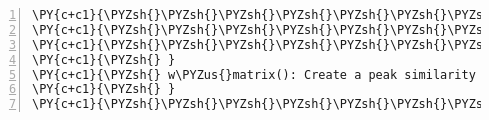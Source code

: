 \begin{Verbatim}[commandchars=\\\{\},codes={\catcode`\$=3\catcode`\^=7\catcode`\_=8},gobble=0,numbers=left,fontfamily=fvm,fontshape=n,fontsize=\footnotesize,tabsize=2]
\PY{c+c1}{\PYZsh{}\PYZsh{}\PYZsh{}\PYZsh{}\PYZsh{}\PYZsh{}\PYZsh{}\PYZsh{}\PYZsh{}\PYZsh{}\PYZsh{}\PYZsh{}\PYZsh{}\PYZsh{}\PYZsh{}\PYZsh{}\PYZsh{}\PYZsh{}\PYZsh{}\PYZsh{}\PYZsh{}\PYZsh{}\PYZsh{}\PYZsh{}\PYZsh{}\PYZsh{}\PYZsh{}\PYZsh{}\PYZsh{}\PYZsh{}\PYZsh{}\PYZsh{}\PYZsh{}\PYZsh{}\PYZsh{}\PYZsh{}\PYZsh{}\PYZsh{}\PYZsh{}\PYZsh{}\PYZsh{}\PYZsh{}\PYZsh{}\PYZsh{}\PYZsh{}\PYZsh{}\PYZsh{}\PYZsh{}\PYZsh{}\PYZsh{}\PYZsh{}\PYZsh{}\PYZsh{}\PYZsh{}\PYZsh{}\PYZsh{}\PYZsh{}\PYZsh{}\PYZsh{}\PYZsh{}\PYZsh{}\PYZsh{}\PYZsh{}\PYZsh{}\PYZsh{}\PYZsh{}\PYZsh{}\PYZsh{}\PYZsh{}\PYZsh{}\PYZsh{}\PYZsh{}\PYZsh{}\PYZsh{}\PYZsh{}\PYZsh{}\PYZsh{}\PYZsh{}\PYZsh{}}
\PY{c+c1}{\PYZsh{}\PYZsh{}\PYZsh{}\PYZsh{}\PYZsh{}\PYZsh{}\PYZsh{}\PYZsh{}\PYZsh{}\PYZsh{}\PYZsh{}\PYZsh{}\PYZsh{}\PYZsh{}\PYZsh{}\PYZsh{}\PYZsh{}\PYZsh{}\PYZsh{}\PYZsh{}\PYZsh{}\PYZsh{}\PYZsh{}\PYZsh{}\PYZsh{}\PYZsh{}\PYZsh{}\PYZsh{}\PYZsh{}\PYZsh{}\PYZsh{}\PYZsh{}\PYZsh{}\PYZsh{}\PYZsh{}\PYZsh{}\PYZsh{} Function \PYZsh{}\PYZsh{}\PYZsh{}\PYZsh{}\PYZsh{}\PYZsh{}\PYZsh{}\PYZsh{}\PYZsh{}\PYZsh{}\PYZsh{}\PYZsh{}\PYZsh{}\PYZsh{}\PYZsh{}\PYZsh{}\PYZsh{}\PYZsh{}\PYZsh{}\PYZsh{}\PYZsh{}\PYZsh{}\PYZsh{}\PYZsh{}\PYZsh{}\PYZsh{}\PYZsh{}\PYZsh{}\PYZsh{}\PYZsh{}\PYZsh{}\PYZsh{}}
\PY{c+c1}{\PYZsh{}\PYZsh{}\PYZsh{}\PYZsh{}\PYZsh{}\PYZsh{}\PYZsh{}\PYZsh{}\PYZsh{}\PYZsh{}\PYZsh{}\PYZsh{}\PYZsh{}\PYZsh{}\PYZsh{}\PYZsh{}\PYZsh{}\PYZsh{}\PYZsh{}\PYZsh{}\PYZsh{}\PYZsh{}\PYZsh{}\PYZsh{}\PYZsh{}\PYZsh{}\PYZsh{}\PYZsh{}\PYZsh{}\PYZsh{}\PYZsh{}\PYZsh{}\PYZsh{}\PYZsh{}\PYZsh{}\PYZsh{}\PYZsh{}\PYZsh{}\PYZsh{}\PYZsh{}\PYZsh{}\PYZsh{}\PYZsh{}\PYZsh{}\PYZsh{}\PYZsh{}\PYZsh{}\PYZsh{}\PYZsh{}\PYZsh{}\PYZsh{}\PYZsh{}\PYZsh{}\PYZsh{}\PYZsh{}\PYZsh{}\PYZsh{}\PYZsh{}\PYZsh{}\PYZsh{}\PYZsh{}\PYZsh{}\PYZsh{}\PYZsh{}\PYZsh{}\PYZsh{}\PYZsh{}\PYZsh{}\PYZsh{}\PYZsh{}\PYZsh{}\PYZsh{}\PYZsh{}\PYZsh{}\PYZsh{}\PYZsh{}\PYZsh{}\PYZsh{}\PYZsh{}}
\PY{c+c1}{\PYZsh{} }
\PY{c+c1}{\PYZsh{} w\PYZus{}matrix(): Create a peak similarity matrix between an N\PYZhy{} and M\PYZhy{}alignment}
\PY{c+c1}{\PYZsh{} }
\PY{c+c1}{\PYZsh{}\PYZsh{}\PYZsh{}\PYZsh{}\PYZsh{}\PYZsh{}\PYZsh{}\PYZsh{}\PYZsh{}\PYZsh{}\PYZsh{}\PYZsh{}\PYZsh{}\PYZsh{}\PYZsh{}\PYZsh{}\PYZsh{}\PYZsh{}\PYZsh{}\PYZsh{}\PYZsh{}\PYZsh{}\PYZsh{}\PYZsh{}\PYZsh{}\PYZsh{}\PYZsh{}\PYZsh{}\PYZsh{}\PYZsh{}\PYZsh{}\PYZsh{}\PYZsh{}\PYZsh{}\PYZsh{}\PYZsh{}\PYZsh{}\PYZsh{}\PYZsh{}\PYZsh{}\PYZsh{}\PYZsh{}\PYZsh{}\PYZsh{}\PYZsh{}\PYZsh{}\PYZsh{}\PYZsh{}\PYZsh{}\PYZsh{}\PYZsh{}\PYZsh{}\PYZsh{}\PYZsh{}\PYZsh{}\PYZsh{}\PYZsh{}\PYZsh{}\PYZsh{}\PYZsh{}\PYZsh{}\PYZsh{}\PYZsh{}\PYZsh{}\PYZsh{}\PYZsh{}\PYZsh{}\PYZsh{}\PYZsh{}\PYZsh{}\PYZsh{}\PYZsh{}\PYZsh{}\PYZsh{}\PYZsh{}\PYZsh{}\PYZsh{}\PYZsh{}\PYZsh{}}

\end{Verbatim}
